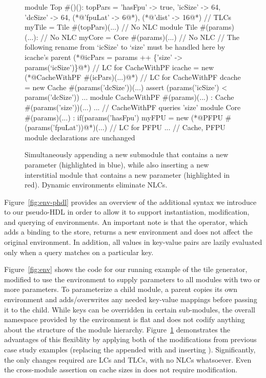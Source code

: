 \begin{figure}
\centering
\begin{phdl}
module Top #()():
  topPars = {'hasFpu' -> true, 'icSize' -> 64, 'dcSize' -> 64, (*@\textcolor[rgb]{0,0,1}{'fpuLat' -> 6}@*), (*@\textcolor[rgb]{1,0,0}{'dist' -> 16}@*) } // TLCs
  myTile = Tile #(topPars)(...)                                  // No NLC
module Tile #(params)(...):                                      // No NLC
  myCore = Core #(params)(...)                                   // No NLC
  // The following rename from `icSize' to `size' must be handled here by icache's parent
  (*@\textcolor[rgb]{1,0,0}{icPars = params ++ \{'size' -> params(`icSize')\}}@*)                // LC for CacheWithPF
  icache = new (*@\textcolor[rgb]{1,0,0}{CacheWithPF \#(icPars)(...)}@*)                        // LC for CacheWithPF
  dcache = new Cache #(params('dcSize'))(...)
  assert (params('icSize') < params('dcSize')) ...
module CacheWithPF #(params)(...) :
  Cache #(params('size'))(...) ... // CacheWithPF queries 'size'
module Core #(params)(...) :
   if(params('hasFpu') myFPU = new (*@\textcolor[rgb]{0,0,1}{PFPU \#(params('fpuLat'))}@*)(...) // LC for PFPU
... // Cache, PFPU module declarations are unchanged
\end{phdl} 
\caption{Simultaneously appending a new submodule that contains a new parameter (highlighted in blue), while also inserting
a new interstitial module that contains a new parameter (highlighted in red). Dynamic environments eliminate NLCs.}
\label{fig:env-delta}
\end{figure}
Figure~\ref{fig:env-phdl} provides an overview of the additional syntax we introduce to our pseudo-HDL in order to allow it to support instantiation, modification, and querying of environments.
An important note is that the \code{++} operator, which adds a binding to the store, returns a new environment and does not affect the original environment.
In addition, all values in key-value pairs are lazily evaluated only when a query matches on a particular key.

Figure~\ref{fig:env} shows the code for our running example of the tile generator, modified to use the environment to supply parameters to all modules with two or more parameters.
To parameterize a child module, a parent copies its own environment and adds/overwrites any needed key-value mappings before passing it to the child.
While keys can be overridden in certain sub-modules, the overall namespace provided by the environment is flat and does not codify anything about the structure of the module hierarchy.
Figure~\ref{fig:env-delta} demonstrates the advantages of this flexiblity by applying both of the modifications from previous case study examples
(replacing the appended  with  and inserting ).
Significantly, the only changes required are LCs and TLCs, with no NLCs whatsoever.
Even the cross-module assertion on cache sizes in  does not require modification.

